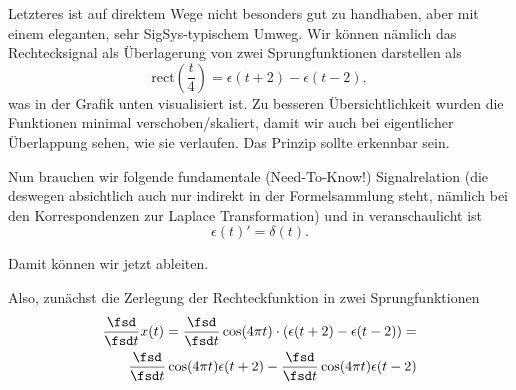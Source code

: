 \begin{ExCalc}
Letzteres ist auf direktem Wege nicht besonders gut zu handhaben, aber mit einem eleganten, sehr SigSys-typischem Umweg.
%
Wir können nämlich das Rechtecksignal als Überlagerung von zwei Sprungfunktionen darstellen als
\begin{equation}
\mathrm{rect}(\frac{t}{4}) = \epsilon(t+2) -\epsilon(t-2),
\end{equation}
was in der Grafik unten visualisiert ist. Zu besseren Übersichtlichkeit wurden die
Funktionen minimal verschoben/skaliert, damit wir auch bei eigentlicher
Überlappung sehen, wie sie verlaufen. Das Prinzip sollte erkennbar sein.
%
\begin{center}
\end{center}

Nun brauchen wir folgende fundamentale (Need-To-Know!) Signalrelation (die deswegen
absichtlich auch nur indirekt in der Formelsammlung
steht, nämlich bei den Korrespondenzen zur Laplace Transformation) und in
 veranschaulicht ist
\begin{equation}
  \epsilon(t)' = \delta(t).
\end{equation}

Damit können wir jetzt ableiten.

Also, zunächst die Zerlegung der Rechteckfunktion in zwei Sprungfunktionen
\begin{align}
\frac{\fsd }{\fsd t} x(t) =
\frac{\fsd }{\fsd t} \cos(4\pi t) \cdot \left( \epsilon(t+2) -\epsilon(t-2)\right)=\\
\frac{\fsd }{\fsd t} \cos(4\pi t) \epsilon(t+2)
- \frac{\fsd }{\fsd t} \cos(4\pi t) \epsilon(t-2)
\end{align}


\end{ExCalc}
